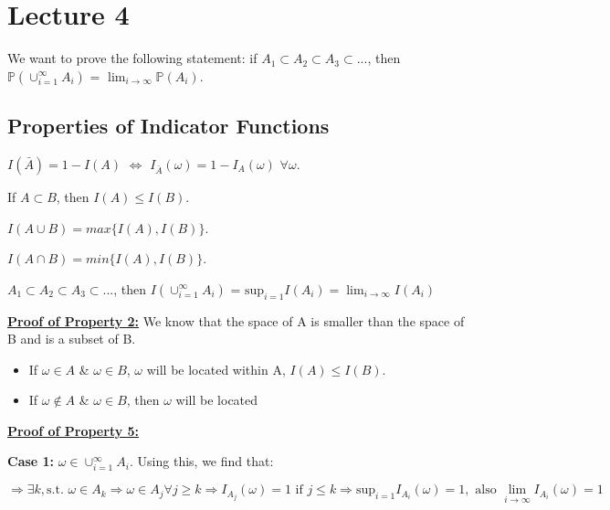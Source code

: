 \section{Lecture 4}

We want to prove the following statement: if $A_1 \subset A_2 \subset A_3 \subset ...$, then $\mathbb{P}(\cup_{i=1}^{\infty} A_i)$ = $\lim_{i\rightarrow \infty}\mathbb{P}(A_i)$.

\subsection{Properties of Indicator Functions}

\begin{ppty}
    $I(\bar{A}) = 1 - I(A)$ $\Longleftrightarrow$ $I_{\bar{A}}(\omega) = 1 - I_A(\omega)$ $\forall \omega$.
\end{ppty}
\begin{ppty}
    If $A \subset B$, then $I(A) \leq I(B)$.
\end{ppty}\label{property:indicator2}
\begin{ppty}
    $I(A \cup B) = max\{I(A), I(B)\}$.
\end{ppty}
\begin{ppty}
    $I(A \cap B) = min\{I(A), I(B)\}$.
\end{ppty}
\begin{ppty}
    $A_1 \subset A_2 \subset A_3 \subset ...$, then $I(\cup_{i=1}^{\infty} A_i)$ = $\text{sup}_{i=1}I(A_i) = \lim_{i\rightarrow\infty}I(A_i)$
\end{ppty}\label{property:indicator5}


\underline{\textbf{Proof of Property 2:}} We know that the space of A is smaller than the space of B and is a subset of B. 
\begin{itemize}
    \item If $\omega \in A$ \& $\omega \in B$, $\omega$ will be located within A, $I(A) \leq I(B)$.
    \item If $\omega \notin A$ \& $\omega \in B$, then $\omega$ will be located 
\end{itemize}

\underline{\textbf{Proof of Property 5:}}

\textbf{Case 1:} $\omega \in \cup_{i=1}^{\infty}A_i$. Using this, we find that:

\begin{equation*}
     \Rightarrow \exists k, \text{s.t. } \omega \in A_k \Rightarrow \omega \in A_j \forall j \geq k \Rightarrow I_{A_j}(\omega) = 1 \text{ if } j\leq k \Rightarrow \text{sup}_{i=1}I_{A_i}(\omega) = 1, \text{ also } \lim_{i\rightarrow\infty} I_{A_i}(\omega) = 1
\end{equation*}

